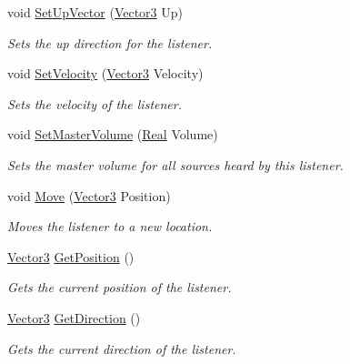 \begin{DoxyCompactItemize}
void \hyperlink{classphys_1_1SoundListener_a51d6f4ccbbbe059e330eba6ef218eda8}{SetUpVector} (\hyperlink{classphys_1_1Vector3}{Vector3} Up)
\begin{DoxyCompactList}\small\item\em Sets the up direction for the listener. \item\end{DoxyCompactList}\item 
void \hyperlink{classphys_1_1SoundListener_a22e63d58ca9710f9a54fb08dbd9be4d9}{SetVelocity} (\hyperlink{classphys_1_1Vector3}{Vector3} Velocity)
\begin{DoxyCompactList}\small\item\em Sets the velocity of the listener. \item\end{DoxyCompactList}\item 
void \hyperlink{classphys_1_1SoundListener_a8375218557d4a79889bc59da6b064a43}{SetMasterVolume} (\hyperlink{namespacephys_af7eb897198d265b8e868f45240230d5f}{Real} Volume)
\begin{DoxyCompactList}\small\item\em Sets the master volume for all sources heard by this listener. \item\end{DoxyCompactList}\item 
void \hyperlink{classphys_1_1SoundListener_a6fb5a26760d0ec460271393fd493dda2}{Move} (\hyperlink{classphys_1_1Vector3}{Vector3} Position)
\begin{DoxyCompactList}\small\item\em Moves the listener to a new location. \item\end{DoxyCompactList}\item 
\hyperlink{classphys_1_1Vector3}{Vector3} \hyperlink{classphys_1_1SoundListener_ad0bec6f468f7bcfa3cadfafbd22a8603}{GetPosition} ()
\begin{DoxyCompactList}\small\item\em Gets the current position of the listener. \item\end{DoxyCompactList}\item 
\hyperlink{classphys_1_1Vector3}{Vector3} \hyperlink{classphys_1_1SoundListener_a5277c24127bd23796710516c21154b49}{GetDirection} ()
\begin{DoxyCompactList}\small\item\em Gets the current direction of the listener. \item\end{DoxyCompactList}\item 

\end{DoxyCompactItemize}
